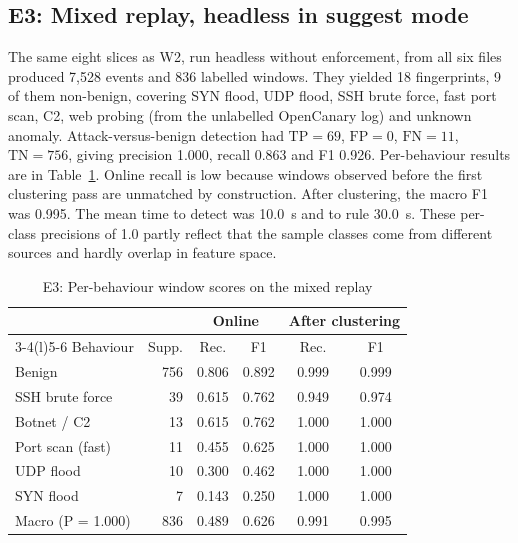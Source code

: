 \documentclass[conference]{IEEEtran}
\begin{document}
\subsection{E3: Mixed replay, headless in suggest mode}
The same eight slices as W2, run headless without enforcement, from all six files produced 7,528 events and 836 labelled windows. They yielded 18 fingerprints, 9 of them non-benign, covering SYN flood, UDP flood, SSH brute force, fast port scan, C2, web probing (from the unlabelled OpenCanary log) and unknown anomaly. Attack-versus-benign detection had $\mathrm{TP}=69$, $\mathrm{FP}=0$, $\mathrm{FN}=11$, $\mathrm{TN}=756$, giving precision 1.000, recall 0.863 and F1 0.926. Per-behaviour results are in Table~\ref{tab:e3}. Online recall is low because windows observed before the first clustering pass are unmatched by construction. After clustering, the macro F1 was 0.995. The mean time to detect was 10.0~s and to rule 30.0~s. These per-class precisions of 1.0 partly reflect that the sample classes come from different sources and hardly overlap in feature space.

\begin{table}[t]
\centering
\caption{E3: Per-behaviour window scores on the mixed replay}
\label{tab:e3}
\footnotesize
\setlength{\tabcolsep}{3pt}
\begin{tabular}{@{}lrcccc@{}}
\toprule
& & \multicolumn{2}{c}{Online} & \multicolumn{2}{c}{After clustering} \\
\cmidrule(lr){3-4}\cmidrule(l){5-6}
Behaviour & Supp. & Rec. & F1 & Rec. & F1 \\
\midrule
Benign & 756 & 0.806 & 0.892 & 0.999 & 0.999 \\
SSH brute force & 39 & 0.615 & 0.762 & 0.949 & 0.974 \\
Botnet / C2 & 13 & 0.615 & 0.762 & 1.000 & 1.000 \\
Port scan (fast) & 11 & 0.455 & 0.625 & 1.000 & 1.000 \\
UDP flood & 10 & 0.300 & 0.462 & 1.000 & 1.000 \\
SYN flood & 7 & 0.143 & 0.250 & 1.000 & 1.000 \\
\midrule
Macro (P = 1.000) & 836 & 0.489 & 0.626 & 0.991 & 0.995 \\
\bottomrule
\end{tabular}
\end{table}
\end{document}
